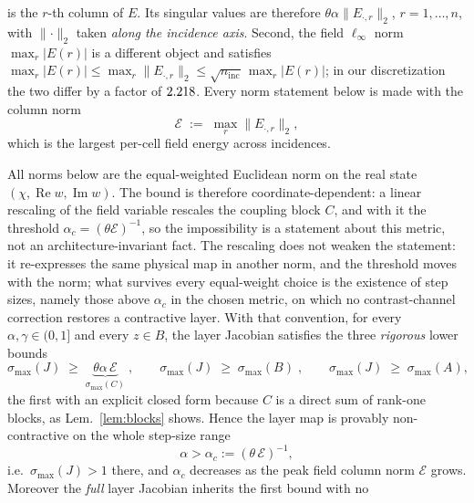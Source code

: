 \documentclass[journal,cmes,article,submit,moreauthors,pdftex]{Definitions/tsp}
\newcommand{\norm}[1]{\lVert #1 \rVert}
\newcommand{\numv}[1]{#1}
\begin{document}
is the $r$-th column of $E$. Its singular values are therefore
$\theta\alpha\norm{E_{\cdot,r}}_2$, $r=1,\dots,n$, with $\norm{\cdot}_2$ taken \emph{along the
incidence axis}. Second, the field $\ell_\infty$ norm $\max_r|E(r)|$ is a
different object and satisfies
$\max_r|E(r)|\le\max_r\norm{E_{\cdot,r}}_2\le\sqrt{n_{\mathrm{inc}}}\,\max_r|E(r)|$; in our
discretization the two differ by a factor of $\numv{\NumEInfRatio}$. Every norm statement below is
made with the column norm
\begin{equation}\label{eq:Ecol}
\mathcal{E}\;:=\;\max_{r}\norm{E_{\cdot,r}}_2 ,
\end{equation}
which is the largest per-cell field energy across incidences.

\begin{Proposition}\label{prop:imposs}
All norms below are the equal-weighted Euclidean norm on the real state
$(\chi,\operatorname{Re}w,\operatorname{Im}w)$. The bound is therefore coordinate-dependent: a
linear rescaling of the field variable rescales the coupling block $C$, and with it the threshold
$\alpha_c=(\theta\mathcal{E})^{-1}$, so the impossibility is a statement about this metric, not an
architecture-invariant fact. The rescaling does not weaken the statement: it re-expresses the same
physical map in another norm, and the threshold moves with the norm; what survives every
equal-weight choice is the existence of step sizes, namely those above $\alpha_c$ in the chosen
metric, on which no contrast-channel correction restores a contractive layer. With that
convention, for every $\alpha,\gamma\in(0,1]$ and every
$z\in B$, the layer Jacobian satisfies the three \emph{rigorous} lower bounds
\begin{equation}\label{eq:impossbound}
\sigma_{\max}(J)\;\ge\;\underbrace{\theta\alpha\,\mathcal{E}}_{\sigma_{\max}(C)}\;,
\qquad
\sigma_{\max}(J)\;\ge\;\sigma_{\max}(B)\;,\qquad
\sigma_{\max}(J)\;\ge\;\sigma_{\max}(A),
\end{equation}
the first with an explicit closed form because $C$ is a direct sum of rank-one blocks, as Lem.~\ref{lem:blocks} shows. Hence the layer map is provably non-contractive on the whole step-size
range
\begin{equation}\label{eq:alphac}
\alpha>\alpha_c:=(\theta\,\mathcal{E})^{-1},
\end{equation}
i.e.\ $\sigma_{\max}(J)>1$ there, and $\alpha_c$ decreases as the peak field column norm
$\mathcal{E}$ grows. Moreover the \emph{full} layer Jacobian inherits the first bound with no

\end{Proposition}
\end{document}
